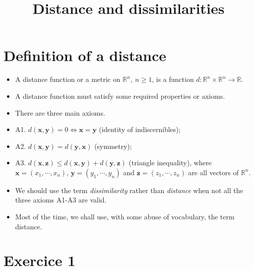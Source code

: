 \documentclass[
]{article}
\title{Distance and dissimilarities}
\author{}
\date{\vspace{-2.5em}}
\newenvironment{Shaded}{\begin{snugshade}}{\end{snugshade}}
\newcommand{\DataTypeTok}[1]{\textcolor[rgb]{0.13,0.29,0.53}{#1}}
\newcommand{\KeywordTok}[1]{\textcolor[rgb]{0.13,0.29,0.53}{\textbf{#1}}}
\newcommand{\NormalTok}[1]{#1}
\newcommand{\OperatorTok}[1]{\textcolor[rgb]{0.81,0.36,0.00}{\textbf{#1}}}
\newcommand{\OtherTok}[1]{\textcolor[rgb]{0.56,0.35,0.01}{#1}}
\begin{document}
\maketitle

{
\setcounter{tocdepth}{2}
\tableofcontents
}
\begin{Shaded}
\end{Shaded}

\hypertarget{definition-of-a-distance}{%
\section{Definition of a distance}\label{definition-of-a-distance}}

\begin{itemize}
\item
  A distance function or a metric on \(\mathbb{R}^n,\:n\geq 1\), is a
  function \(d:\mathbb{R}^n\times\mathbb{R}^n\rightarrow \mathbb{R}\).
\item
  A distance function must satisfy some required properties or axioms.
\item
  There are three main axioms.
\item
  A1. \(d(\mathbf{x},\mathbf{y})= 0\iff \mathbf{x}=\mathbf{y}\)
  (identity of indiscernibles);
\item
  A2. \(d(\mathbf{x},\mathbf{y})= d(\mathbf{y},\mathbf{x})\) (symmetry);
\item
  A3.
  \(d(\mathbf{x},\mathbf{z})\leq d(\mathbf{x},\mathbf{y})+d(\mathbf{y},\mathbf{z})\)
  (triangle inequality), where \(\mathbf{x}=(x_1,\cdots,x_n)\),
  \(\mathbf{y}=(y_1,\cdots,y_n)\) and \(\mathbf{z}=(z_1,\cdots,z_n)\)
  are all vectors of \(\mathbb{R}^n\).
\item
  We should use the term \emph{dissimilarity} rather than
  \emph{distance} when not all the three axioms A1-A3 are valid.
\item
  Most of the time, we shall use, with some abuse of vocabulary, the
  term distance.
\end{itemize}

\hypertarget{exercice-1}{%
\section{Exercice 1}\label{exercice-1}}
\end{document}
